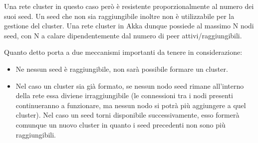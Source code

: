 \noindent Una rete cluster in questo caso però è resistente proporzionalmente al numero dei suoi seed. Un seed che non sia raggiungibile inoltre non è utilizzabile per la gestione del cluster. Una rete cluster in Akka dunque possiede al massimo N nodi seed, con N a calare dipendentemente dal numero di peer attivi/raggiungibili.\newline

\noindent Quanto detto porta a due meccanismi importanti da tenere in considerazione:
\begin{itemize}
    \item Ne nessun seed è raggiungibile, non sarà possibile formare un cluster.
    \item Nel caso un cluster sia già formato, se nessun nodo seed rimane all'interno della rete essa diviene irraggiungibile (le connessioni tra i nodi presenti continueranno a funzionare, ma nessun nodo si potrà più aggiungere a quel cluster). Nel caso un seed torni disponibile successivamente, esso formerà comunque un nuovo cluster in quanto i seed precedenti non sono più raggiungibili.
\end{itemize}
